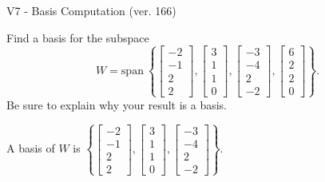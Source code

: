 \begin{exercise}
  \begin{exerciseTitle}V7 - Basis Computation (ver. 166)\end{exerciseTitle}
  \begin{exerciseStatement}
    Find a basis for the subspace 
\[W=\mathrm{span}\ \left\{\left[\begin{array}{r}
-2 \\
-1 \\
2 \\
2
\end{array}\right] , \left[\begin{array}{r}
3 \\
1 \\
1 \\
0
\end{array}\right] , \left[\begin{array}{r}
-3 \\
-4 \\
2 \\
-2
\end{array}\right] , \left[\begin{array}{r}
6 \\
2 \\
2 \\
0
\end{array}\right]\right\}.\]
 Be sure to explain why your result is a basis.


  \end{exerciseStatement}
  \begin{exerciseAnswer}
   A basis of \(W\) is  \(\left\{\left[\begin{array}{r}
-2 \\
-1 \\
2 \\
2
\end{array}\right] , \left[\begin{array}{r}
3 \\
1 \\
1 \\
0
\end{array}\right] , \left[\begin{array}{r}
-3 \\
-4 \\
2 \\
-2
\end{array}\right]\right\}\).
  


  \end{exerciseAnswer}
\end{exercise}